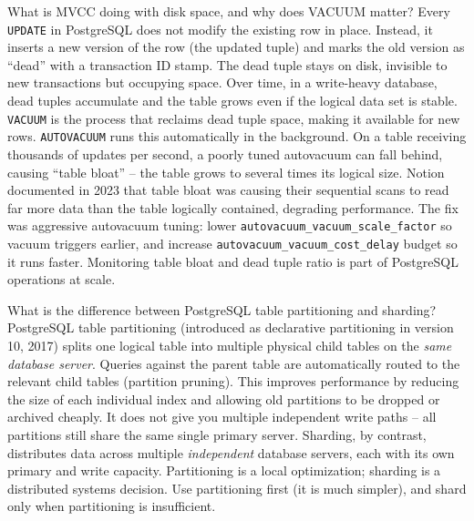 \documentclass[11pt,a4paper]{article}
\begin{document}
\begin{curiobox}{What is MVCC doing with disk space, and why does VACUUM matter?}
Every \texttt{UPDATE} in PostgreSQL does not modify the existing row in place. Instead, it inserts a new version of the row (the updated tuple) and marks the old version as ``dead'' with a transaction ID stamp. The dead tuple stays on disk, invisible to new transactions but occupying space. Over time, in a write-heavy database, dead tuples accumulate and the table grows even if the logical data set is stable. \texttt{VACUUM} is the process that reclaims dead tuple space, making it available for new rows. \texttt{AUTOVACUUM} runs this automatically in the background. On a table receiving thousands of updates per second, a poorly tuned autovacuum can fall behind, causing ``table bloat'' -- the table grows to several times its logical size. Notion documented in 2023 that table bloat was causing their sequential scans to read far more data than the table logically contained, degrading performance. The fix was aggressive autovacuum tuning: lower \texttt{autovacuum\_vacuum\_scale\_factor} so vacuum triggers earlier, and increase \texttt{autovacuum\_vacuum\_cost\_delay} budget so it runs faster. Monitoring table bloat and dead tuple ratio is part of PostgreSQL operations at scale.
\end{curiobox}

\begin{curiobox}{What is the difference between PostgreSQL table partitioning and sharding?}
PostgreSQL table partitioning (introduced as declarative partitioning in version 10, 2017) splits one logical table into multiple physical child tables on the \emph{same database server}. Queries against the parent table are automatically routed to the relevant child tables (partition pruning). This improves performance by reducing the size of each individual index and allowing old partitions to be dropped or archived cheaply. It does not give you multiple independent write paths -- all partitions still share the same single primary server. Sharding, by contrast, distributes data across multiple \emph{independent} database servers, each with its own primary and write capacity. Partitioning is a local optimization; sharding is a distributed systems decision. Use partitioning first (it is much simpler), and shard only when partitioning is insufficient.
\end{curiobox}
\end{document}
